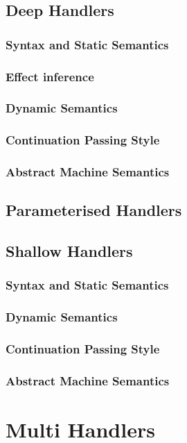 \documentclass[11pt,phd,lfcs,twoside,openright,logo,leftchapter,normalheadings]{infthesis}
\begin{document}
\section{Deep Handlers}
\subsection{Syntax and Static Semantics}
\subsection{Effect inference}
\subsection{Dynamic Semantics}
\subsection{Continuation Passing Style}
\subsection{Abstract Machine Semantics}

\section{Parameterised Handlers}

\section{Shallow Handlers}
\label{ch:shallow-handlers}

\subsection{Syntax and Static Semantics}
\subsection{Dynamic Semantics}
\subsection{Continuation Passing Style}
\subsection{Abstract Machine Semantics}

\chapter{Multi Handlers}
\label{ch:multi-handlers}
\end{document}
